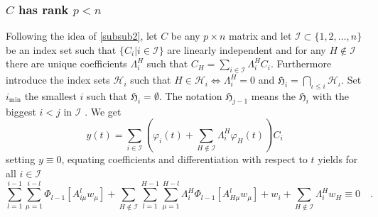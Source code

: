 
\clearpage
\subsubsection{$C$ has rank $p < n$}\label{subsub3}
	Following the idea of \ref{subsub2}, let $C$ be any $p\times n$ matrix and let 
	$\mathcal{I}\subset \{1,2,\ldots,n\}$ be an index set such that $\{C_i|i\in
	\mathcal{I}\}$ are linearly 
	independent and for any $H\notin \mathcal{I}$ there are unique coefficients $
	\Lambda_i^H$ such that $C_H=\sum_{i\in\mathcal{I}} \Lambda^H_i C_i$. 
	Furthermore introduce the index sets $\mathcal{H}_i$ such that $H\in \mathcal{H}_i 
	\Leftrightarrow \Lambda_i^H = 0$ and $\mathfrak{H}_i=\bigcap_{\iota\leq i}
	\mathcal{H}_\iota$. Set $i_\text{min}$ the smallest $i$ such that 
	$\mathfrak{H}_i= \emptyset $. The notation $\mathfrak{H}_{j-1}$ means the $
	\mathfrak{H}_i$ 
	with the biggest $i<j$ in $\mathcal{I}$ .
	We get
	\begin{equation}
	y(t) = \sum\limits_{i\in\mathcal{I}} \left(\varphi_i(t) + \sum\limits_{H\notin 
	\mathcal{I}}\Lambda^H_i \varphi_H(t) \right) C_i 
	\end{equation}
	setting $y\equiv 0$, equating coefficients and differentiation with respect to $t$ 
	yields for all $i\in\mathcal{I}$
	\begin{equation}
	\sum\limits_{l=1}^{i-1}\sum\limits_{\mu=1}^{i-l} \Phi_{l-1}\left[A^l_{i\mu}
	w_\mu \right]
	+ \sum\limits_{H\notin \mathcal{I}}\sum\limits_{l=1}^{H-1}\sum\limits_{\mu=1}^{H-l}
	\Lambda_i^H \Phi_{l-1}\left[A^l_{H\mu} w_\mu \right] +
	w_i + \sum\limits_{H\notin\mathcal{I}} \Lambda_i^H w_H \equiv 0\quad. 
	\label{eq:volterra_alt1:C_general}
	\end{equation}
	
